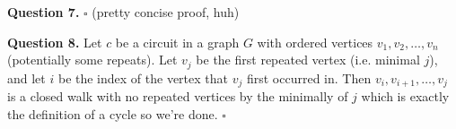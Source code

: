 \documentclass[letterpaper, reqno,11pt]{article}
\begin{document}

{\medskip\noindent\bf Question 7.} $\square$ (pretty concise proof, huh)


{\medskip\noindent\bf Question 8.} Let $c$ be a circuit in a graph $G$ with ordered vertices $v_1,v_2,\ldots,v_n$ (potentially some repeats). Let $v_j$ be the first repeated vertex (i.e. minimal $j$), and let $i$ be the index of the vertex that $v_j$ first occurred in. Then $v_i, v_{i+1}, \ldots, v_j$ is a closed walk with no repeated vertices by the minimally of $j$ which is exactly the definition of a cycle so we're done. $\square$
\end{document}
